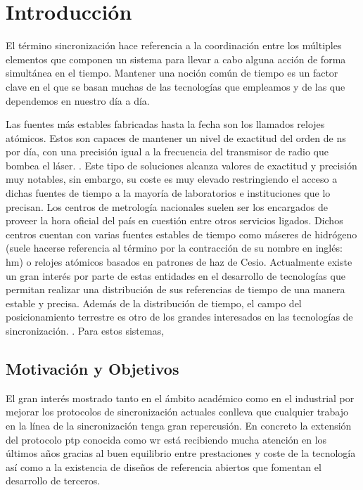 \chapter{Introducción}

El término sincronización hace referencia a la coordinación entre los múltiples 
elementos que componen un sistema para llevar a cabo alguna acción de forma 
simultánea en el tiempo. Mantener una noción común de tiempo es un factor clave 
en el que se basan muchas de las tecnologías que empleamos y de las que 
dependemos en nuestro día a día.

 Las 
fuentes más estables fabricadas hasta la fecha son los llamados relojes
atómicos. 
 Estos son capaces de mantener un nivel de exactitud del 
orden de \gls{ns} por día, con una precisión igual a la frecuencia del
transmisor de radio que bombea el láser.  . Este tipo de 
soluciones alcanza valores de exactitud y precisión muy notables, sin embargo, 
su coste es muy elevado restringiendo el acceso a dichas fuentes de tiempo a la 
mayoría de laboratorios e instituciones que lo precisan. Los centros de 
metrología nacionales suelen ser los encargados de proveer la hora oficial del 
país en cuestión entre otros servicios ligados. Dichos centros cuentan con 
varias fuentes estables de tiempo como máseres de hidrógeno (suele
hacerse referencia al término por la contracción de su nombre en inglés: 
\acrshort{hm}) o relojes atómicos basados en patrones de haz de Cesio. 
Actualmente existe un gran interés por parte de estas entidades en el 
desarrollo de tecnologías que permitan realizar una distribución de sus 
referencias de tiempo de una manera estable y precisa.
Además de la distribución de tiempo, el campo del posicionamiento terrestre es 
otro de los grandes interesados en las tecnologías de sincronización. 
. Para estos sistemas, 



\section{Motivación y Objetivos}

El gran interés mostrado tanto en el ámbito académico como en el industrial por 
mejorar los protocolos de sincronización actuales conlleva que cualquier 
trabajo en la línea de la sincronización tenga gran repercusión. En concreto la 
extensión del protocolo \gls{ptp} conocida como \gls{wr} está recibiendo mucha 
atención en los últimos años gracias al buen equilibrio entre prestaciones y 
coste de la tecnología así como a la existencia de diseños de referencia 
abiertos que fomentan el desarrollo de terceros.

